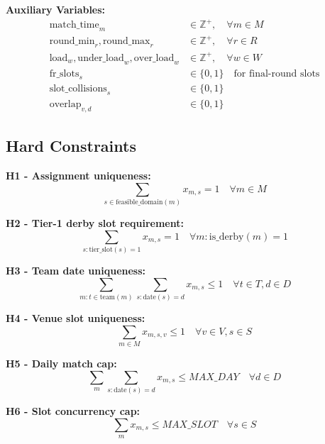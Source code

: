\documentclass[a4paper,11pt]{article}
\begin{document}
\textbf{Auxiliary Variables:}
\begin{align}
\text{match\_time}_m &\in \mathbb{Z}^+, \quad \forall m \in M \\
\text{round\_min}_r, \text{round\_max}_r &\in \mathbb{Z}^+, \quad \forall r \in R \\
\text{load}_w, \text{under\_load}_w, \text{over\_load}_w &\in \mathbb{Z}^+, \quad \forall w \in W \\
\text{fr\_slots}_s &\in \{0,1\} \quad \text{for final-round slots} \\
\text{slot\_collisions}_s &\in \{0,1\} \\
\text{overlap}_{v,d} &\in \{0,1\}
\end{align}

\subsection{Hard Constraints}

\textbf{H1 - Assignment uniqueness:}
\begin{equation}
\sum_{s \in \text{feasible\_domain}(m)} x_{m,s} = 1 \quad \forall m \in M
\end{equation}

\textbf{H2 - Tier-1 derby slot requirement:}
\begin{equation}
\sum_{s: \text{tier\_slot}(s)=1} x_{m,s} = 1 \quad \forall m : \text{is\_derby}(m)=1
\end{equation}

\textbf{H3 - Team date uniqueness:}
\begin{equation}
\sum_{m: t \in \text{team}(m)} \sum_{s: \text{date}(s)=d} x_{m,s} \le 1 \quad \forall t \in T, d \in D
\end{equation}

\textbf{H4 - Venue slot uniqueness:}
\begin{equation}
\sum_{m \in M} x_{m,s,v} \le 1 \quad \forall v \in V, s \in S
\end{equation}

\textbf{H5 - Daily match cap:}
\begin{equation}
\sum_{m} \sum_{s: \text{date}(s)=d} x_{m,s} \le MAX\_DAY \quad \forall d \in D
\end{equation}

\textbf{H6 - Slot concurrency cap:}
\begin{equation}
\sum_{m} x_{m,s} \le MAX\_SLOT \quad \forall s \in S
\end{equation}
\end{document}
